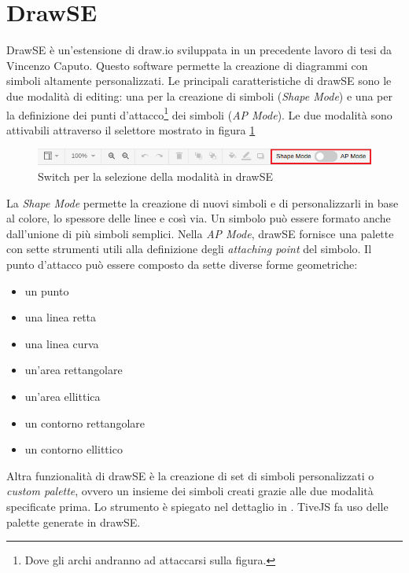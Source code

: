     \section{DrawSE}
        DrawSE è un'estensione di draw.io sviluppata in un precedente lavoro di tesi da Vincenzo Caputo. Questo software permette la creazione di diagrammi con simboli altamente personalizzati. Le principali caratteristiche di drawSE sono le due modalità di editing: una per la creazione di simboli (\textit{Shape Mode}) e una per la definizione dei punti d'attacco\footnote{Dove gli archi andranno ad attaccarsi sulla figura.} dei simboli (\textit{AP Mode}).
        Le due modalità sono attivabili attraverso il selettore mostrato in figura \ref{fig:mode_switch}
        \begin{figure}[htbp]
            \centering
            \includegraphics[scale=0.7]{Figure/mode_switch.png}
            \caption{Switch per la selezione della modalità in drawSE}
            \label{fig:mode_switch}
        \end{figure}
        \newline
        La \textit{Shape Mode} permette la creazione di nuovi simboli e di personalizzarli in base al colore, lo spessore delle linee e così via. Un simbolo può essere formato anche dall'unione di più simboli semplici.
        Nella \textit{AP Mode}, drawSE fornisce una palette con sette strumenti utili alla definizione degli \textit{attaching point} del simbolo. Il punto d'attacco può essere composto da sette diverse forme geometriche:
        \begin{itemize}
            \item un punto
            \item una linea retta
            \item una linea curva
            \item un'area rettangolare
            \item un'area ellittica
            \item un contorno rettangolare
            \item un contorno ellittico
        \end{itemize}
        Altra funzionalità di drawSE è la creazione di set di simboli personalizzati o \textit{custom palette}, ovvero un insieme dei simboli creati grazie alle due modalità specificate prima. Lo strumento è spiegato nel dettaglio in \cite{drawSE}. TiveJS fa uso delle palette generate in drawSE.